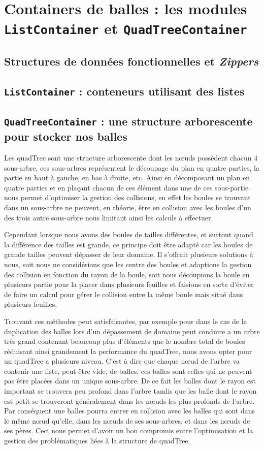 \documentclass[a4paper]{scrartcl}
\begin{document}
\section{Containers de balles : les modules \texttt{ListContainer}
  et \texttt{QuadTreeContainer}}
\subsection{Structures de données fonctionnelles et \emph{Zippers}}
\subsection{\texttt{ListContainer} : conteneurs utilisant des listes}
\subsection{\texttt{QuadTreeContainer} : une structure arborescente
  pour stocker nos balles}

Les quadTree sont une structure arborescente dont les nœuds possèdent chacun 4 sous-arbre, ces sous-arbres représentent le découpage du plan en quatre parties, la partie en haut à gauche, en bas à droite, etc. Ainsi en décomposant un plan en quatre parties et en plaçant chacun de ces élément dans une de ces sous-partie nous permet d'optimiser la gestion des collisions, en effet les boules se trouvant dans un sous-arbre ne peuvent, en théorie, être en collision avec les boules d'un des trois autre sous-arbre nous limitant ainsi les calculs à effectuer.

Cependant lorsque nous avons des boules de tailles différentes, et surtout quand la différence des tailles est grande, ce principe doit être adapté car les boules de grande tailles peuvent dépasser de leur domaine.
Il s'offrait plusieurs solutions à nous, soit nous ne considérions que les centre des boules et adaptions la gestion des collision en fonction du rayon de la boule, soit nous découpions la boule en plusieurs partie pour la placer dans plusieurs feuilles et faisions en sorte d'éviter de faire un calcul pour gérer le collision entre la même boule mais situé dans plusieurs feuilles.

Trouvant ces méthodes peut satisfaisantes, par exemple pour dans le cas de la duplication des balles lors d'un dépassement de domaine peut conduire a un arbre très grand contenant beaucoup plus d'éléments que le nombre total de boules réduisant ainsi grandement la performance du quadTree, nous avons opter pour un quadTree a plusieurs niveau. C'est à dire que chaque nœud de l'arbre va contenir une liste, peut-être vide, de balles, ces balles sont celles qui ne peuvent pas être placées dans un unique sous-arbre. De ce fait les balles dont le rayon est important se trouvera peu profond dans l'arbre tandis que les balle dont le rayon est petit se trouveront généralement dans les nœuds les plus profonds de l'arbre. Par conséquent une balles pourra entrer en collision avec les balles qui sont dans le même nœud qu'elle, dans les nœuds de ses sous-arbres, et dans les nœuds de ses pères. Ceci nous permet d'avoir un bon compromis entre l'optimisation et la gestion des problématiques liées à la structure de quadTree.
\end{document}

